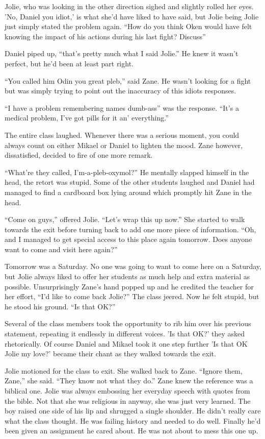 Jolie, who was looking in the other direction sighed and slightly rolled her eyes.  'No, Daniel you idiot,' is what she'd have liked to have said, but Jolie being Jolie just simply stated the problem again.  ``How do you think Oken would have felt knowing the impact of his actions during his last fight?  Discuss''

Daniel piped up, ``that's pretty much what I said Jolie.''  He knew it wasn't perfect, but he'd been at least part right.

``You called him Odin you great pleb,'' said Zane.  He wasn't looking for a fight but was simply trying to point out the inaccuracy of this idiots responses.  

``I have a problem remembering names dumb-ass'' was the response.  ``It's a medical problem, I've got pills for it an' everything.''

The entire class laughed.  Whenever there was a serious moment, you could always count on either Mikael or Daniel to lighten the mood.  Zane however, dissatisfied, decided to fire of one more remark.  

``What're they called, I'm-a-pleb-oxymol?''  He mentally slapped himself in the head, the retort was stupid.  Some of the other students laughed and Daniel had managed to find a cardboard box lying around which promptly hit Zane in the head.

``Come on guys,'' offered Jolie.  ``Let's wrap this up now.''  She started to walk towards the exit before turning back to add one more piece of information.  ``Oh, and I managed to get special access to this place again tomorrow.  Does anyone want to come and visit here again?''

Tomorrow was a Saturday.  No one was going to want to come here on a Saturday, but Jolie always liked to offer her students as much help and extra material as possible.  Unsurprisingly Zane's hand popped up and he credited the teacher for her effort, ``I'd like to come back Jolie?''  The class jeered.  Now he felt stupid, but he stood his ground.  ``Is that OK?''

Several of the class members took the opportunity to rib him over his previous statement, repeating it endlessly in different voices.  'Is that OK?' they asked rhetorically.  Of course Daniel and Mikael took it one step further 'Is that OK Jolie my love?' became their chant as they walked towards the exit.

Jolie motioned for the class to exit.  She walked back to Zane.  ``Ignore them, Zane,'' she said.  ``They know not what they do.''  Zane knew the reference was a biblical one.  Jolie was always embossing her everyday speech with quotes from the bible.  Not that she was religious in anyway, she was just very learned.  The boy raised one side of his lip and shrugged a single shoulder.  He didn't really care what the class thought.  He was failing history and needed to do well.  Finally he'd been given an assignment he cared about.  He was not about to mess this one up.

